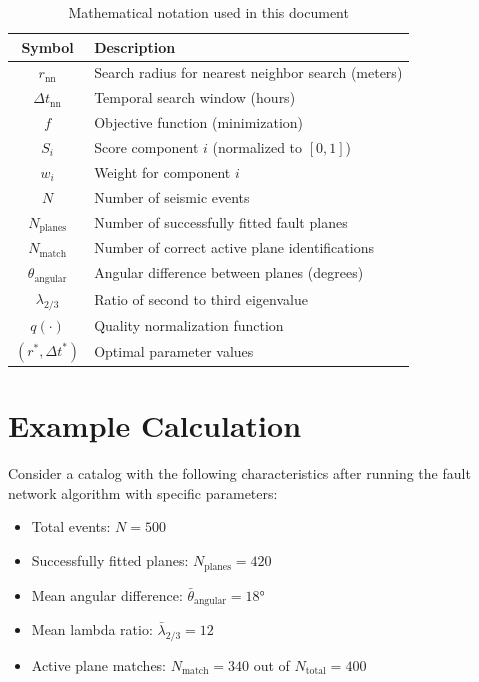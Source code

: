 \documentclass[11pt,a4paper]{article}
\begin{document}
\begin{table}[h]
\centering
\caption{Mathematical notation used in this document}
\label{tab:notation}
\begin{tabular}{cl}
\toprule
\textbf{Symbol} & \textbf{Description} \\
\midrule
$r_{\text{nn}}$ & Search radius for nearest neighbor search (meters) \\
$\Delta t_{\text{nn}}$ & Temporal search window (hours) \\
$f$ & Objective function (minimization) \\
$S_i$ & Score component $i$ (normalized to $[0,1]$) \\
$w_i$ & Weight for component $i$ \\
$N$ & Number of seismic events \\
$N_{\text{planes}}$ & Number of successfully fitted fault planes \\
$N_{\text{match}}$ & Number of correct active plane identifications \\
$\theta_{\text{angular}}$ & Angular difference between planes (degrees) \\
$\lambda_{2/3}$ & Ratio of second to third eigenvalue \\
$q(\cdot)$ & Quality normalization function \\
$(r^*, \Delta t^*)$ & Optimal parameter values \\
\bottomrule
\end{tabular}
\end{table}

\section{Example Calculation}

Consider a catalog with the following characteristics after running the fault network algorithm with specific parameters:

\begin{itemize}
    \item Total events: $N = 500$
    \item Successfully fitted planes: $N_{\text{planes}} = 420$
    \item Mean angular difference: $\bar{\theta}_{\text{angular}} = 18°$
    \item Mean lambda ratio: $\bar{\lambda}_{2/3} = 12$
    \item Active plane matches: $N_{\text{match}} = 340$ out of $N_{\text{total}} = 400$
\end{itemize}
\end{document}
